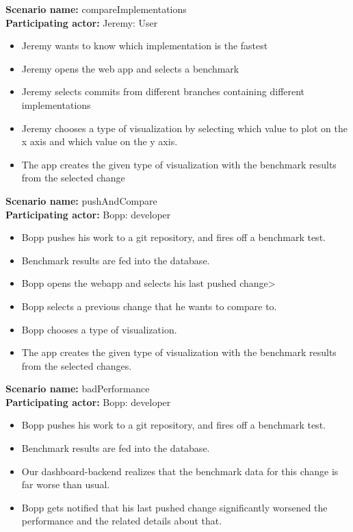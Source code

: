 \documentclass[parskip=full,11pt]{scrartcl}
\begin{document}
\textbf{Scenario name:} compareImplementations \\
\textbf{Participating actor:} Jeremy: User
\begin{itemize}
	\item Jeremy wants to know which implementation is the fastest
	\item Jeremy opens the web app and selects a benchmark
	\item Jeremy selects commits from different branches containing different implementations
	\item Jeremy chooses a type of visualization by selecting which value to plot on the x axis and which value on the y axis.
	\item The app creates the given type of visualization with the benchmark results from the selected change
\end{itemize}

\textbf{Scenario name:} pushAndCompare \\
\textbf{Participating actor:} Bopp: \gls{developer}
\begin{itemize}
	\item Bopp pushes his work to a git repository, and fires off a benchmark test.
	\item Benchmark results are fed into the database.
	\item Bopp opens the webapp and selects his last pushed change>
	\item Bopp selects a previous change that he wants to compare to.
	\item Bopp chooses a type of visualization.
	\item The app creates the given type of visualization with the benchmark results from the selected changes.
\end{itemize}

\textbf{Scenario name:} badPerformance \\
\textbf{Participating actor:} Bopp: \gls{developer}
\begin{itemize}
	\item Bopp pushes his work to a git repository, and fires off a benchmark test.
	\item Benchmark results are fed into the database.
	\item Our dashboard-backend realizes that the benchmark data for this change is far worse than usual.
	\item Bopp gets notified that his last pushed change significantly worsened the performance and the related details about that.
\end{itemize}
\end{document}
